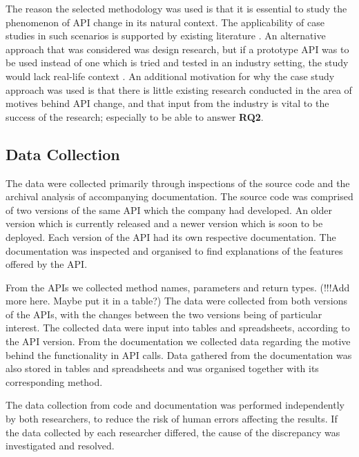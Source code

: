\documentclass[conference]{IEEEtran}
\begin{document}
The reason the selected methodology was used is that it is essential to study the phenomenon of API change in its natural context. The applicability of case studies in such scenarios is supported by existing literature \cite{benbasat1987case} \cite{runeson2009guidelines} \cite{yin2013case} \cite{robson2002real}. An alternative approach that was considered was design research, but if a prototype API was to be used instead of one which is tried and tested in an industry setting, the study would lack real-life context \cite{runeson2009guidelines}. An additional motivation for why the case study approach was used is that there is little existing research conducted in the area of motives behind API change, and that input from the industry is vital to the success of the research; especially to be able to answer \textbf{RQ2}. 

\subsection{Data Collection} \label{data_collection}
The data were collected primarily through inspections of the source code and the archival analysis of accompanying  documentation. The source code was comprised of two versions of the same API which the company had developed. An older version which is currently released and a newer version which is soon to be deployed. Each version of the API had its own respective documentation. The documentation was inspected and organised to find explanations of the features offered by the API. 

From the APIs we collected method names, parameters and return types. (!!!Add more here. Maybe put it in a table?) The data were collected from both versions of the APIs, with the changes between the two versions being of particular interest. The collected data were input into tables and spreadsheets, according to the API version. From the documentation we collected data regarding the motive behind the functionality in API calls. Data gathered from the documentation was also stored in tables and spreadsheets and was organised together with its corresponding method.

The data collection from code and documentation was performed independently by both researchers, to reduce the risk of human errors affecting the results. If the data collected by each researcher differed, the cause of the discrepancy was investigated and resolved. 
\end{document}
